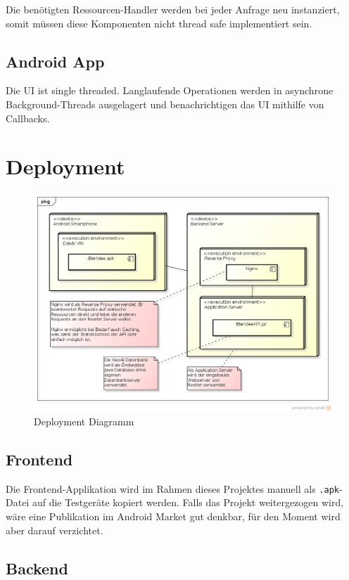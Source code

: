 \documentclass[10pt,a4paper]{scrartcl}
\begin{document}
Die benötigten Ressourcen-Handler werden bei jeder Anfrage neu instanziert, somit müssen diese
Komponenten nicht thread safe implementiert sein.

\subsection{Android App}

Die UI ist single threaded. Langlaufende Operationen werden in asynchrone Background-Threads ausgelagert und
benachrichtigen das UI mithilfe von Callbacks.


\section{Deployment}

\begin{figure}[H]
	\includegraphics[width=\textwidth]{DeploymentDiagram.png}
	\caption{Deployment Diagramm}
	\label{fig:deployment_diagram}
\end{figure}

\subsection{Frontend}

Die Frontend-Applikation wird im Rahmen dieses Projektes manuell als \texttt{.apk}-Datei auf die
Testgeräte kopiert werden. Falls das Projekt weitergezogen wird, wäre eine Publikation im Android
Market gut denkbar, für den Moment wird aber darauf verzichtet.


\subsection{Backend}
\end{document}
